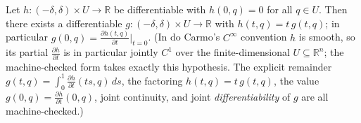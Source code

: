 \begin{lemma}
  \label{lem:dc-ch0-5-5}
  \leanok
  Let $h:(-\delta,\delta)\times U\to\mathbb{R}$ be differentiable with $h(0,q)=0$
  for all $q\in U$. Then there exists a differentiable
  $g:(-\delta,\delta)\times U\to\mathbb{R}$ with $h(t,q)=t\,g(t,q)$; in particular
  $g(0,q)=\frac{\partial h(t,q)}{\partial t}\big|_{t=0}$.
  (In do Carmo's $C^\infty$ convention $h$ is smooth, so its partial
  $\frac{\partial h}{\partial t}$ is in particular jointly $C^1$ over the
  finite-dimensional $U\subseteq\mathbb{R}^n$; the machine-checked form takes
  exactly this hypothesis. The explicit remainder
  $g(t,q)=\int_0^1\frac{\partial h}{\partial t}(ts,q)\,ds$, the factoring
  $h(t,q)=t\,g(t,q)$, the value $g(0,q)=\frac{\partial h}{\partial t}(0,q)$, joint
  continuity, and joint \emph{differentiability} of $g$ are all machine-checked.)
\end{lemma}
